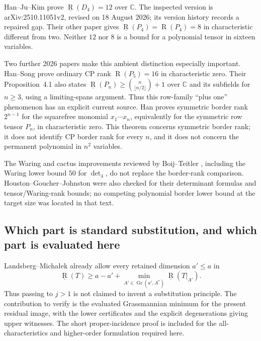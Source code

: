 Han--Ju--Kim \cite[Theorem~1.1 and \S3]{HJK2026} prove
$\underline{\operatorname R}(D_4)=12$ over $\mathbb C$.
The inspected version is arXiv:2510.11051v2, revised on
18 August 2026; its version history records a repaired gap.
Their other paper \cite[Theorems~5.6--5.7]{HJK2025} gives
$\underline{\operatorname R}(P_4)=\operatorname R(P_4)=8$
in characteristic different from two. Neither $12$ nor $8$
is a bound for a polynomial tensor in sixteen variables.

Two further 2026 papers make this ambient distinction
especially important. Han--Song
\cite[Theorem~A, p.~3; Proposition~4.1, p.~10]{HS2026}
prove ordinary CP rank $\operatorname R(P_5)=16$ in
characteristic zero. Their Proposition~4.1 also states
$\underline{\operatorname R}(P_n)\geq
\binom{n}{\lfloor n/2\rfloor}+1$ over $\mathbb C$
and its subfields for $n\geq3$, using a limiting-spans
argument. Thus this row-family ``plus one'' phenomenon
has an explicit current source. Han
\cite[Theorem~A, p.~2]{Han2026} proves symmetric border
rank $2^{n-1}$ for the squarefree monomial
$x_1\cdots x_n$, equivalently for the symmetric row
tensor $P_n$, in characteristic zero. This theorem
concerns symmetric border rank; it does not identify
CP border rank for every $n$, and it does not concern
the permanent polynomial in $n^2$ variables.

The Waring and cactus improvements reviewed by
Boij--Teitler \cite[background, pp.~5--7; \S4, p.~15]{BT2020},
including the Waring lower bound $50$ for $\det_4$, do not
replace the border-rank comparison. Houston--Goucher--Johnston
\cite{HGJ2024} were also checked for their determinant formulas
and tensor/Waring-rank bounds; no competing polynomial border
lower bound at the target size was located in that text.

\subsection{Which part is standard substitution, and which part is evaluated here}

Landsberg--Micha\l ek \cite[Proposition~2.3, p.~3]{LM2018}
already allow every retained dimension $a'\leq a$ in
\[
 \underline{\operatorname R}(T)
 \geq a-a'+
 \min_{A'\in\operatorname{Gr}(a',A^*)}
       \underline{\operatorname R}(T|_{A'}).
\]
Thus passing to $j>1$ is not claimed to invent a substitution
principle. The contribution to verify is the evaluated
Grassmannian minimum for the present residual image, with
the lower certificates and the explicit degenerations giving
upper witnesses. The short proper-incidence proof is included
for the all-characteristics and higher-order formulation
required here.

